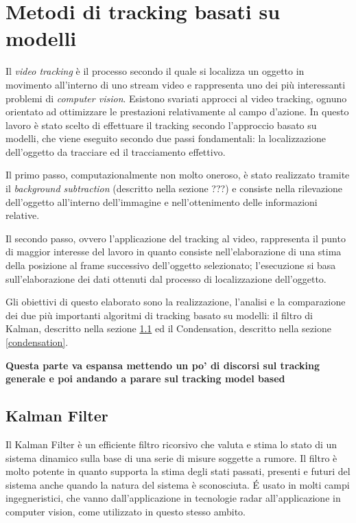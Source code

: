 \section{Metodi di tracking basati su modelli} \label{modelTracking}
Il \textit{video tracking} è il processo secondo il quale si localizza un oggetto in movimento all'interno di uno stream video e rappresenta uno dei più interessanti problemi di \textit{computer vision}. Esistono svariati approcci al video tracking, ognuno orientato ad ottimizzare le prestazioni relativamente al campo d'azione. In questo lavoro è stato scelto di effettuare il tracking secondo l'approccio basato su modelli, che viene eseguito secondo due passi fondamentali: la localizzazione dell'oggetto da tracciare ed il tracciamento effettivo.

Il primo passo, computazionalmente non molto oneroso, è stato realizzato tramite il \textit{background subtraction} (descritto nella sezione ???) e consiste nella rilevazione dell'oggetto all'interno dell'immagine e nell'ottenimento delle informazioni relative.

Il secondo passo, ovvero l'applicazione del tracking al video, rappresenta il punto di maggior interesse del lavoro in quanto consiste nell'elaborazione di una stima della posizione al frame successivo dell'oggetto selezionato; l'esecuzione si basa sull'elaborazione dei dati ottenuti dal processo di localizzazione dell'oggetto.

Gli obiettivi di questo elaborato sono la realizzazione, l'analisi e la comparazione dei due più importanti algoritmi di tracking basato su modelli: il filtro di Kalman, descritto nella sezione \ref{kalman} ed il Condensation, descritto nella sezione \ref{condensation}.

\textbf{Questa parte va espansa mettendo un po' di discorsi sul tracking generale e poi andando a parare sul tracking model based}

\subsection{Kalman Filter}\label{kalman}
Il Kalman Filter\cite{kalman-intro} è un efficiente filtro ricorsivo che valuta e stima lo stato di un sistema dinamico sulla base di una serie di misure soggette a rumore. Il filtro è molto potente in quanto supporta la stima degli stati passati, presenti e futuri del sistema anche quando la natura del sistema è sconosciuta. \'E usato in molti campi ingegneristici, che vanno dall'applicazione in tecnologie radar all'applicazione in computer vision, come utilizzato in questo stesso ambito.
